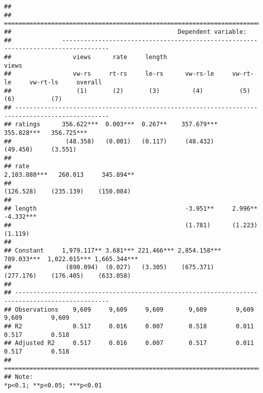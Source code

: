 \documentclass[
]{article}
\begin{document}
\begin{verbatim}
## 
## ================================================================================================
##                                              Dependent variable:                                
##              -----------------------------------------------------------------------------------
##                 views      rate     length                          views                       
##                 vw-rs     rt-rs     le-rs      vw-rs-le     vw-rt-le     vw-rt-ls     overall   
##                  (1)       (2)       (3)         (4)          (5)          (6)          (7)     
## ------------------------------------------------------------------------------------------------
## ratings      356.622***  0.003***  0.267**    357.679***                355.828***   356.725*** 
##               (48.358)   (0.001)   (0.117)     (48.432)                  (49.450)     (3.551)   
##                                                                                                 
## rate                                                      2,103.880***   260.013     345.894**  
##                                                            (126.528)    (235.139)    (150.084)  
##                                                                                                 
## length                                         -3.951**     2.996**                  -4.332***  
##                                                (1.781)      (1.223)                   (1.119)   
##                                                                                                 
## Constant     1,979.117** 3.681*** 221.466*** 2,854.158***  789.033***  1,022.015*** 1,665.344***
##               (890.094)  (0.027)   (3.305)    (675.371)    (277.176)    (176.405)    (633.058)  
##                                                                                                 
## ------------------------------------------------------------------------------------------------
## Observations    9,609     9,609     9,609       9,609        9,609        9,609        9,609    
## R2              0.517     0.016     0.007       0.518        0.011        0.517        0.518    
## Adjusted R2     0.517     0.016     0.007       0.517        0.011        0.517        0.518    
## ================================================================================================
## Note:                                                                *p<0.1; **p<0.05; ***p<0.01
\end{verbatim}
\end{document}
